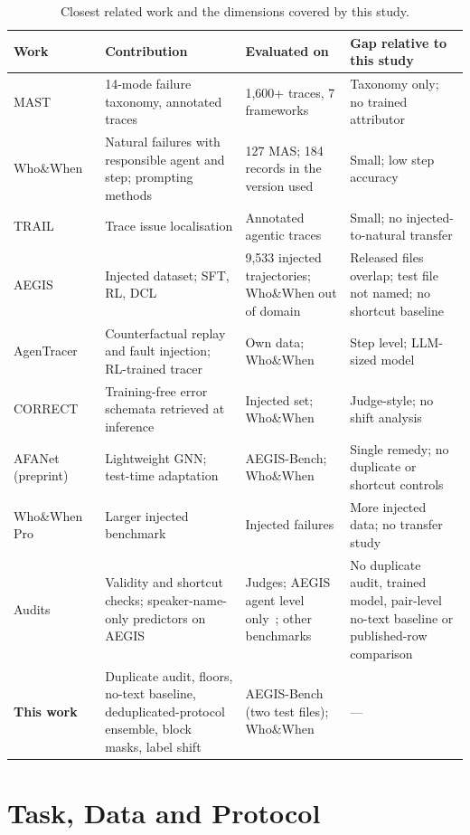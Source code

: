 \documentclass[conference]{IEEEtran}
\begin{document}
\begin{table}[t]
\caption{Closest related work and the dimensions covered by this study.}
\label{tab:related}
\centering\footnotesize
\begin{tabularx}{\textwidth}{@{}l Y Y Y@{}}
\toprule
Work & Contribution & Evaluated on & Gap relative to this study \\
\midrule
MAST~\cite{mast} & 14-mode failure taxonomy, annotated traces & 1,600+ traces, 7 frameworks & Taxonomy only; no trained attributor \\
Who\&When~\cite{whowhen} & Natural failures with responsible agent and step; prompting methods & 127 MAS; 184 records in the version used & Small; low step accuracy \\
TRAIL~\cite{trail} & Trace issue localisation & Annotated agentic traces & Small; no injected-to-natural transfer \\
AEGIS~\cite{aegis} & Injected dataset; SFT, RL, DCL & 9,533 injected trajectories; Who\&When out of domain & Released files overlap; test file not named; no shortcut baseline \\
AgenTracer~\cite{agentracer} & Counterfactual replay and fault injection; RL-trained tracer & Own data; Who\&When & Step level; LLM-sized model \\
CORRECT~\cite{correct} & Training-free error schemata retrieved at inference & Injected set; Who\&When & Judge-style; no shift analysis \\
AFANet~\cite{afanet} (preprint) & Lightweight GNN; test-time adaptation & AEGIS-Bench; Who\&When & Single remedy; no duplicate or shortcut controls \\
Who\&When Pro~\cite{whenpro} & Larger injected benchmark & Injected failures & More injected data; no transfer study \\
Audits~\cite{audit1,audit2,catch} & Validity and shortcut checks; speaker-name-only predictors on AEGIS~\cite{audit2} & Judges; AEGIS agent level only~\cite{audit2}; other benchmarks & No duplicate audit, trained model, pair-level no-text baseline or published-row comparison \\
\textbf{This work} & Duplicate audit, floors, no-text baseline, deduplicated-protocol ensemble, block masks, label shift & AEGIS-Bench (two test files); Who\&When & --- \\
\bottomrule
\end{tabularx}
\end{table}

\section{Task, Data and Protocol}\label{sec:protocol}
\end{document}
